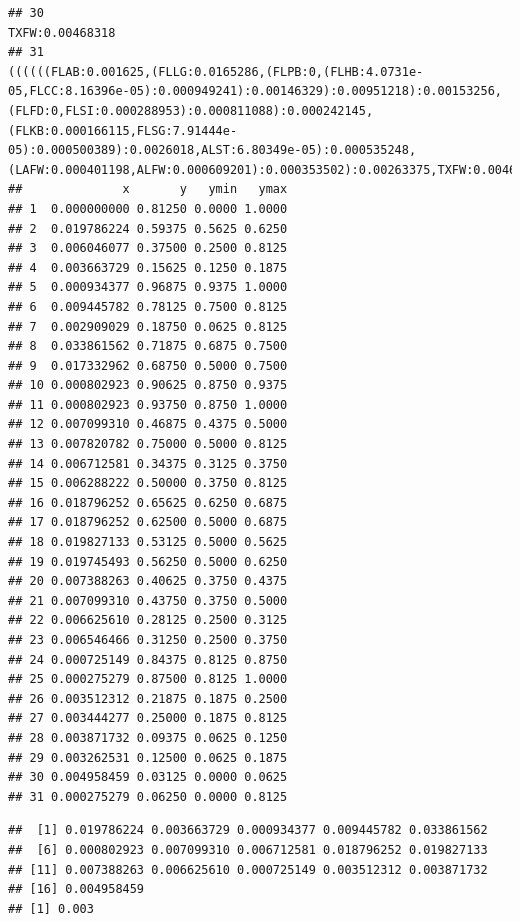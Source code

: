 \documentclass[]{article}
\begin{document}
\begin{verbatim}
## 30                                                                                                                                                                                                                                                                                                                                                                                                                            TXFW:0.00468318
## 31                                                                        ((((((FLAB:0.001625,(FLLG:0.0165286,(FLPB:0,(FLHB:4.0731e-05,FLCC:8.16396e-05):0.000949241):0.00146329):0.00951218):0.00153256,(FLFD:0,FLSI:0.000288953):0.000811088):0.000242145,(FLKB:0.000166115,FLSG:7.91444e-05):0.000500389):0.0026018,ALST:6.80349e-05):0.000535248,(LAFW:0.000401198,ALFW:0.000609201):0.000353502):0.00263375,TXFW:0.00468318):0.000275279
##              x       y   ymin   ymax
## 1  0.000000000 0.81250 0.0000 1.0000
## 2  0.019786224 0.59375 0.5625 0.6250
## 3  0.006046077 0.37500 0.2500 0.8125
## 4  0.003663729 0.15625 0.1250 0.1875
## 5  0.000934377 0.96875 0.9375 1.0000
## 6  0.009445782 0.78125 0.7500 0.8125
## 7  0.002909029 0.18750 0.0625 0.8125
## 8  0.033861562 0.71875 0.6875 0.7500
## 9  0.017332962 0.68750 0.5000 0.7500
## 10 0.000802923 0.90625 0.8750 0.9375
## 11 0.000802923 0.93750 0.8750 1.0000
## 12 0.007099310 0.46875 0.4375 0.5000
## 13 0.007820782 0.75000 0.5000 0.8125
## 14 0.006712581 0.34375 0.3125 0.3750
## 15 0.006288222 0.50000 0.3750 0.8125
## 16 0.018796252 0.65625 0.6250 0.6875
## 17 0.018796252 0.62500 0.5000 0.6875
## 18 0.019827133 0.53125 0.5000 0.5625
## 19 0.019745493 0.56250 0.5000 0.6250
## 20 0.007388263 0.40625 0.3750 0.4375
## 21 0.007099310 0.43750 0.3750 0.5000
## 22 0.006625610 0.28125 0.2500 0.3125
## 23 0.006546466 0.31250 0.2500 0.3750
## 24 0.000725149 0.84375 0.8125 0.8750
## 25 0.000275279 0.87500 0.8125 1.0000
## 26 0.003512312 0.21875 0.1875 0.2500
## 27 0.003444277 0.25000 0.1875 0.8125
## 28 0.003871732 0.09375 0.0625 0.1250
## 29 0.003262531 0.12500 0.0625 0.1875
## 30 0.004958459 0.03125 0.0000 0.0625
## 31 0.000275279 0.06250 0.0000 0.8125
\end{verbatim}

\begin{verbatim}
##  [1] 0.019786224 0.003663729 0.000934377 0.009445782 0.033861562
##  [6] 0.000802923 0.007099310 0.006712581 0.018796252 0.019827133
## [11] 0.007388263 0.006625610 0.000725149 0.003512312 0.003871732
## [16] 0.004958459
## [1] 0.003
\end{verbatim}
\end{document}
